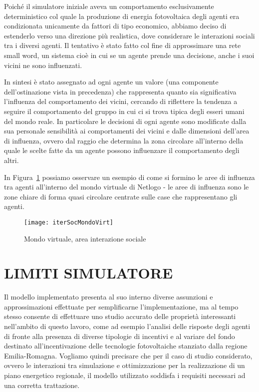 \documentclass[12pt,a4paper,openright,twoside]{report}
\begin{document}
Poiché il simulatore iniziale aveva un comportamento esclusivamente deterministico col quale la produzione di energia fotovoltaica degli agenti era condizionata unicamente da fattori di tipo economico, abbiamo deciso di estenderlo verso una direzione più realistica, dove considerare le interazioni sociali tra i diversi agenti. Il tentativo è stato fatto col fine di approssimare una rete small word, un sistema cioè in cui se un agente prende una decisione, anche i suoi vicini ne sono influenzati.

In sintesi è stato assegnato ad ogni agente un valore (una componente dell'ostinazione vista in precedenza) che rappresenta quanto sia significativa l'influenza del comportamento dei vicini, cercando di riflettere la tendenza a seguire il comportamento del gruppo in cui ci si trova tipica degli esseri umani del mondo reale. In particolare le decisioni di ogni agente sono modificate dalla sua personale sensibilità ai comportamenti dei vicini e dalle dimensioni dell'area di influenza, ovvero dal raggio che determina la zona circolare all'interno della quale le scelte fatte da un agente possono influenzare il comportamento degli altri.

In Figura~\ref{iterSocMondoVirt} possiamo osservare un esempio di come si formino le aree di influenza tra agenti all'interno del mondo virtuale di Netlogo - le aree di influenza sono le zone chiare di forma quasi circolare centrate sulle case che rappresentano gli agenti.

\begin{figure}[hbt]
	\centering
	\texttt{[image: iterSocMondoVirt]}
	\caption{Mondo virtuale, area interazione sociale}
	\label{iterSocMondoVirt}
\end{figure}

\section{LIMITI SIMULATORE}

Il modello implementato presenta al suo interno diverse assunzioni e approssimazioni effettuate per semplificarne l'implementazione, ma al tempo stesso consente di effettuare uno studio accurato delle proprietà interessanti nell'ambito di questo lavoro, come ad esempio l'analisi delle risposte degli agenti di fronte alla presenza di diverse tipologie di incentivi e al variare del fondo destinato all'incentivazione delle tecnologie fotovoltaiche stanziato dalla regione Emilia-Romagna. Vogliamo quindi precisare che per il caso di studio considerato, ovvero le interazioni tra simulazione e ottimizzazione per la realizzazione di un piano energetico regionale, il modello utilizzato soddisfa i requisiti necessari ad una corretta trattazione.
\end{document}
